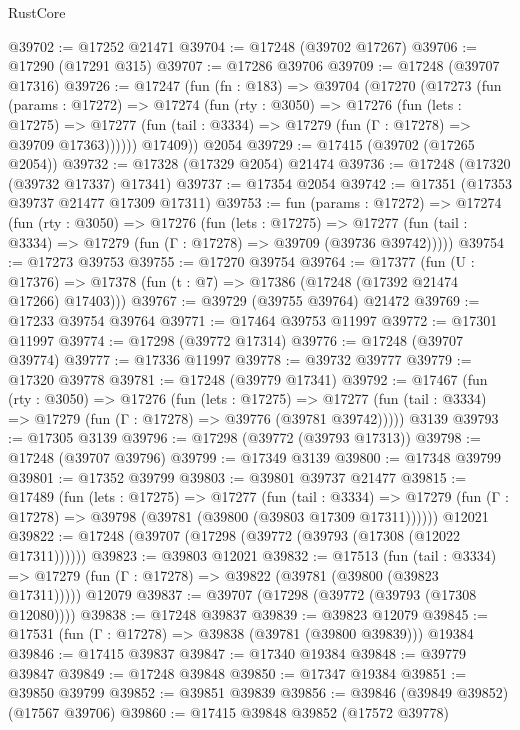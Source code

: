 \begin{lexlean}{RustCore}
\begin{coremodule}
@39702 := @17252 @21471
@39704 := @17248 (@39702 @17267)
@39706 := @17290 (@17291 @315)
@39707 := @17286 @39706
@39709 := @17248 (@39707 @17316)
@39726 := @17247
    (fun (fn : @183) =>
    @39704
      (@17270
        (@17273
          (fun (params : @17272) =>
          @17274
            (fun (rty : @3050) =>
            @17276
              (fun (lets : @17275) =>
              @17277 (fun (tail : @3334) => @17279 (fun (Γ : @17278) => @39709 @17363))))))
        @17409))
    @2054
@39729 := @17415 (@39702 (@17265 @2054))
@39732 := @17328 (@17329 @2054) @21474
@39736 := @17248 (@17320 (@39732 @17337) @17341)
@39737 := @17354 @2054
@39742 := @17351 (@17353 @39737 @21477 @17309 @17311)
@39753 := fun (params : @17272) =>
  @17274
    (fun (rty : @3050) =>
    @17276
      (fun (lets : @17275) =>
      @17277 (fun (tail : @3334) => @17279 (fun (Γ : @17278) => @39709 (@39736 @39742)))))
@39754 := @17273 @39753
@39755 := @17270 @39754
@39764 := @17377
    (fun (U : @17376) => @17378 (fun (t : @7) => @17386 (@17248 (@17392 @21474 @17266) @17403)))
@39767 := @39729 (@39755 @39764) @21472
@39769 := @17233 @39754 @39764
@39771 := @17464 @39753 @11997
@39772 := @17301 @11997
@39774 := @17298 (@39772 @17314)
@39776 := @17248 (@39707 @39774)
@39777 := @17336 @11997
@39778 := @39732 @39777
@39779 := @17320 @39778
@39781 := @17248 (@39779 @17341)
@39792 := @17467
    (fun (rty : @3050) =>
    @17276
      (fun (lets : @17275) =>
      @17277 (fun (tail : @3334) => @17279 (fun (Γ : @17278) => @39776 (@39781 @39742)))))
    @3139
@39793 := @17305 @3139
@39796 := @17298 (@39772 (@39793 @17313))
@39798 := @17248 (@39707 @39796)
@39799 := @17349 @3139
@39800 := @17348 @39799
@39801 := @17352 @39799
@39803 := @39801 @39737 @21477
@39815 := @17489
    (fun (lets : @17275) =>
    @17277
      (fun (tail : @3334) =>
      @17279 (fun (Γ : @17278) => @39798 (@39781 (@39800 (@39803 @17309 @17311))))))
    @12021
@39822 := @17248 (@39707 (@17298 (@39772 (@39793 (@17308 (@12022 @17311))))))
@39823 := @39803 @12021
@39832 := @17513
    (fun (tail : @3334) => @17279 (fun (Γ : @17278) => @39822 (@39781 (@39800 (@39823 @17311)))))
    @12079
@39837 := @39707 (@17298 (@39772 (@39793 (@17308 @12080))))
@39838 := @17248 @39837
@39839 := @39823 @12079
@39845 := @17531 (fun (Γ : @17278) => @39838 (@39781 (@39800 @39839))) @19384
@39846 := @17415 @39837
@39847 := @17340 @19384
@39848 := @39779 @39847
@39849 := @17248 @39848
@39850 := @17347 @19384
@39851 := @39850 @39799
@39852 := @39851 @39839
@39856 := @39846 (@39849 @39852) (@17567 @39706)
@39860 := @17415 @39848 @39852 (@17572 @39778)

\end{coremodule}
\end{lexlean}
